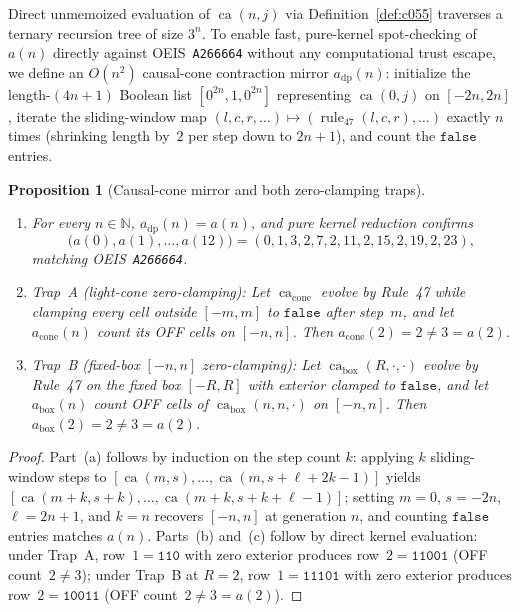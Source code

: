 \documentclass[11pt]{article}
\newtheorem{proposition}[theorem]{Proposition}
\theoremstyle{definition}
\newcommand{\N}{\mathbb{N}}
\newcommand{\seq}[1]{\texttt{#1}}
\newcommand{\ruleFS}{\operatorname{rule}_{47}}
\newcommand{\ca}{\operatorname{ca}}
\begin{document}
Direct unmemoized evaluation of $\ca(n, j)$ via Definition~\ref{def:c055} traverses a ternary recursion tree of size $3^n$. To enable fast, pure-kernel spot-checking of $a(n)$ directly against OEIS~\seq{A266664} without any computational trust escape, we define an $O(n^2)$ causal-cone contraction mirror $a_{\mathrm{dp}}(n)$: initialize the length-$(4n + 1)$ Boolean list $[0^{2n}, 1, 0^{2n}]$ representing $\ca(0, j)$ on $[-2n, 2n]$, iterate the sliding-window map $(l, c, r, \dots) \mapsto (\ruleFS(l, c, r), \dots)$ exactly $n$ times (shrinking length by~$2$ per step down to $2n + 1$), and count the $\mathtt{false}$ entries.

\begin{proposition}[Causal-cone mirror and both zero-clamping traps]
\label{prop:clamping-traps}
\begin{enumerate}
\item[\textup{(a)}] For every $n \in \N$, $a_{\mathrm{dp}}(n) = a(n)$, and pure kernel reduction confirms
\[
\bigl(a(0), a(1), \dots, a(12)\bigr) = (0, 1, 3, 2, 7, 2, 11, 2, 15, 2, 19, 2, 23),
\]
matching OEIS~\seq{A266664}.
\item[\textup{(b)}] \emph{Trap~A (light-cone zero-clamping):} Let $\ca_{\mathrm{cone}}$ evolve by Rule~47 while clamping every cell outside $[-m, m]$ to $\mathtt{false}$ after step~$m$, and let $a_{\mathrm{cone}}(n)$ count its OFF cells on $[-n, n]$. Then $a_{\mathrm{cone}}(2) = 2 \ne 3 = a(2)$.
\item[\textup{(c)}] \emph{Trap~B (fixed-box $[-n, n]$ zero-clamping):} Let $\ca_{\mathrm{box}}(R, \cdot, \cdot)$ evolve by Rule~47 on the fixed box $[-R, R]$ with exterior clamped to $\mathtt{false}$, and let $a_{\mathrm{box}}(n)$ count OFF cells of $\ca_{\mathrm{box}}(n, n, \cdot)$ on $[-n, n]$. Then $a_{\mathrm{box}}(2) = 2 \ne 3 = a(2)$.
\end{enumerate}
\end{proposition}

\begin{proof}
Part~(a) follows by induction on the step count $k$: applying $k$ sliding-window steps to $[\ca(m, s), \dots, \ca(m, s + \ell + 2k - 1)]$ yields $[\ca(m + k, s + k), \dots, \ca(m + k, s + k + \ell - 1)]$; setting $m = 0$, $s = -2n$, $\ell = 2n + 1$, and $k = n$ recovers $[-n, n]$ at generation $n$, and counting $\mathtt{false}$ entries matches $a(n)$. Parts~(b) and~(c) follow by direct kernel evaluation: under Trap~A, row~$1 = \mathtt{110}$ with zero exterior produces row~$2 = \mathtt{11001}$ (OFF count~$2 \ne 3$); under Trap~B at $R = 2$, row~$1 = \mathtt{11101}$ with zero exterior produces row~$2 = \mathtt{10011}$ (OFF count~$2 \ne 3 = a(2)$).
\end{proof}
\end{document}
